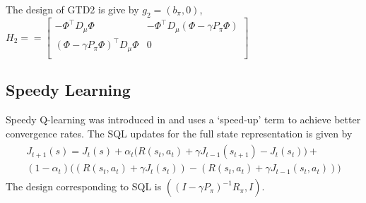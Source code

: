 The design of GTD2 is give by $g_2=(b_\pi,0)$, $H_2==\begin{bmatrix}-\Phi^\top D_\mu\Phi &-\Phi^\top D_\mu (\Phi -\gamma P_\pi\Phi) \\ (\Phi -\gamma P_\pi\Phi)^\top D_\mu\Phi &0 \\ \end{bmatrix}$
\subsection{Speedy Learning}
Speedy Q-learning was introduced in \cite{} and uses a `speed-up’ term to achieve better convergence rates. The SQL updates for the full state representation is given by
\begin{align}\label{sql}
\begin{split}
J_{t+1}(s)=J_t(s)+\alpha_t\big(R(s_t,a_t)+\gamma J_{t-1}(s_{t+1})-J_{t}(s_t) \big)+\\(1-\alpha_t)\big((R(s_t,a_t)+\gamma J_t(s_t))-(R(s_t,a_t)+\gamma J_{t-1}(s_t,a_t))\big)
\end{split}
\end{align}
The design corresponding to SQL is $((I-\gamma P_\pi)^{-1}R_\pi,I)$.